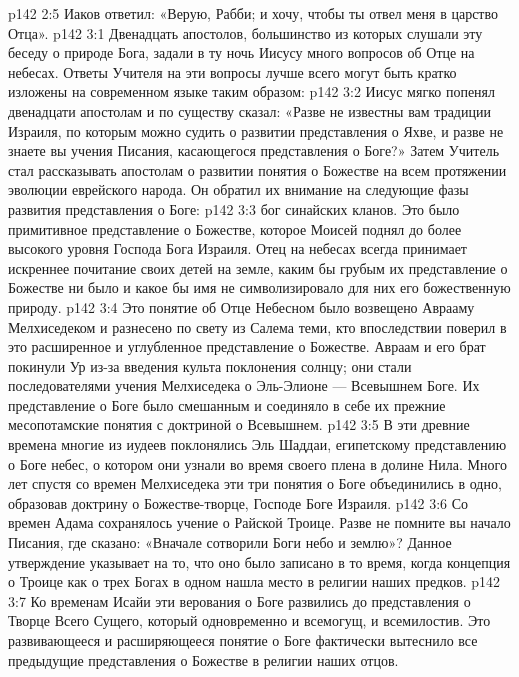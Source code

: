 \vs p142 2:5 Иаков ответил: «Верую, Рабби; и хочу, чтобы ты отвел меня в царство Отца».
\vs p142 3:1 Двенадцать апостолов, большинство из которых слушали эту беседу о природе Бога, задали в ту ночь Иисусу много вопросов об Отце на небесах. Ответы Учителя на эти вопросы лучше всего могут быть кратко изложены на современном языке таким образом:
\vs p142 3:2 Иисус мягко попенял двенадцати апостолам и по существу сказал: «Разве не известны вам традиции Израиля, по которым можно судить о развитии представления о Яхве, и разве не знаете вы учения Писания, касающегося представления о Боге?» Затем Учитель стал рассказывать апостолам о развитии понятия о Божестве на всем протяжении эволюции еврейского народа. Он обратил их внимание на следующие фазы развития представления о Боге:
\vs p142 3:3 \bibnobreakspace {} бог синайских кланов. Это было примитивное представление о Божестве, которое Моисей поднял до более высокого уровня Господа Бога Израиля. Отец на небесах всегда принимает искреннее почитание своих детей на земле, каким бы грубым их представление о Божестве ни было и какое бы имя не символизировало для них его божественную природу.
\vs p142 3:4 \bibnobreakspace {} Это понятие об Отце Небесном было возвещено Аврааму Мелхиседеком и разнесено по свету из Салема теми, кто впоследствии поверил в это расширенное и углубленное представление о Божестве. Авраам и его брат покинули Ур из\hyp{}за введения культа поклонения солнцу; они стали последователями учения Мелхиседека о Эль\hyp{}Элионе --- Всевышнем Боге. Их представление о Боге было смешанным и соединяло в себе их прежние месопотамские понятия с доктриной о Всевышнем.
\vs p142 3:5 \bibnobreakspace {} В эти древние времена многие из иудеев поклонялись Эль Шаддаи, египетскому представлению о Боге небес, о котором они узнали во время своего плена в долине Нила. Много лет спустя со времен Мелхиседека эти три понятия о Боге объединились в одно, образовав доктрину о Божестве\hyp{}творце, Господе Боге Израиля.
\vs p142 3:6 \bibnobreakspace {} Со времен Адама сохранялось учение о Райской Троице. Разве не помните вы начало Писания, где сказано: «Вначале сотворили Боги небо и землю»? Данное утверждение указывает на то, что оно было записано в то время, когда концепция о Троице как о трех Богах в одном нашла место в религии наших предков.
\vs p142 3:7 \bibnobreakspace {} Ко временам Исайи эти верования о Боге развились до представления о Творце Всего Сущего, который одновременно и всемогущ, и всемилостив. Это развивающееся и расширяющееся понятие о Боге фактически вытеснило все предыдущие представления о Божестве в религии наших отцов.
